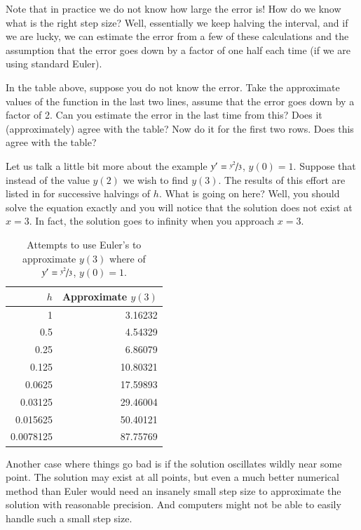 \documentclass[12pt]{book}
\begin{document}
Note that in practice we do not know how large the error is!
How do we know what is
the right step size?  Well, essentially we keep halving the interval, and if we
are lucky, we can estimate the error from a few of these calculations and the
assumption that the error goes down by a factor of one half each time (if
we are using standard Euler).

\begin{exercise}
In the table above, suppose you do not know the error.  Take
the approximate values of the function in the last two lines,
assume that the error goes down by a factor of 2.  Can you estimate the
error in the last time from this?  Does it (approximately) agree with the
table?  Now do it for the first two rows.  Does this agree with the table?
\end{exercise}

Let us talk a little bit more about the example
$y' = \nicefrac{y^2}{3}$, $y(0) =
1$.  Suppose that instead of the value $y(2)$ we wish to find $y(3)$.
The results of this effort are listed in
 for successive halvings of $h$.  What is
going on here?  Well, you should solve the equation exactly and you will
notice that the solution does not exist at $x=3$.  In fact, the solution goes
to infinity when you approach $x=3$.

\begin{table}[h!t]
\capstart
\begin{center}
\begin{tabular}{@{}rr@{}}
\toprule
$h$ & Approximate $y(3)$ \\
\midrule
1        & 3.16232 \\
0.5      & 4.54329 \\
0.25     & 6.86079 \\
0.125    & 10.80321 \\
0.0625   & 17.59893 \\
0.03125  & 29.46004 \\
0.015625 & 50.40121 \\
0.0078125& 87.75769 \\
\bottomrule
\end{tabular}
\end{center}
\caption{Attempts to use Euler's to approximate $y(3)$ where
of $y'=\nicefrac{y^2}{3}$, $y(0)=1$.\label{euler-table2:table}}
\end{table}

Another case where things go bad is if the solution oscillates wildly
near some point.
The solution
may exist at all points, but even a much better numerical method than
Euler would need an insanely small step size to approximate the solution
with reasonable precision.
And computers might not be able to easily handle such a small step size.
\end{document}
